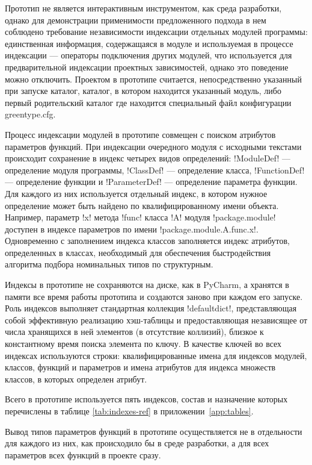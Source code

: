 Прототип не является интерактивным инструментом, как среда разработки, однако
для демонстрации применимости предложенного подхода в нем соблюдено требование
независимости индексации отдельных модулей программы: единственная информация,
содержащаяся в модуле и используемая в процессе индексации --- операторы
подключения других модулей, что используется для предварительной индексации
проектных зависимостей, однако это поведение можно отключить. Проектом в
прототипе считается, непосредственно указанный при запуске каталог, каталог, в
котором находится указанный модуль, либо первый родительский каталог где
находится специальный файл конфигурации greentype.cfg.

Процесс индексации модулей в прототипе совмещен с поиском атрибутов параметров
функций. При индексации очередного модуля с исходными текстами происходит
сохранение в индекс четырех видов определений: !ModuleDef! --- определение
модуля программы, !ClassDef! --- определение класса, !FunctionDef! ---
определение функции и !ParameterDef! --- определение параметра функции. Для
каждого из них используется отдельный индекс, в котором нужное определение может
быть найдено по квалифицированному имени объекта. Например, параметр !x! метода
!func! класса !A! модуля !package.module! доступен в индексе параметров по имени
!package.module.A.func.x!. Одновременно с заполнением индекса классов
заполняется индекс атрибутов, определенных в классах, необходимый для
обеспечения быстродействия алгоритма подбора номинальных типов по структурным.

Индексы в прототипе не сохраняются на диске, как в PyCharm, а хранятся в
памяти все время работы прототипа и создаются заново при каждом его запуске. Роль
индексов выполняет стандартная коллекция !defaultdict!, представляющая собой
эффективную реализацию хэш-таблицы и предоставляющая независящее от числа
хранящихся в ней элементов (в отсутствие коллизий), близкое к константному
время поиска элемента по ключу. В качестве ключей во всех индексах используются
строки: квалифицированные имена для индексов модулей, классов, функций и
параметров и имена атрибутов для индекса множеств классов, в которых определен
атрибут.

Всего в прототипе используется пять индексов, состав и назначение которых
перечислены в таблице \ref{tab:indexes-ref} в приложении~\ref{app:tables}.

Вывод типов параметров функций в прототипе осуществляется не в отдельности для
каждого из них, как происходило бы в среде разработки, а для всех параметров
всех функций в проекте сразу.


